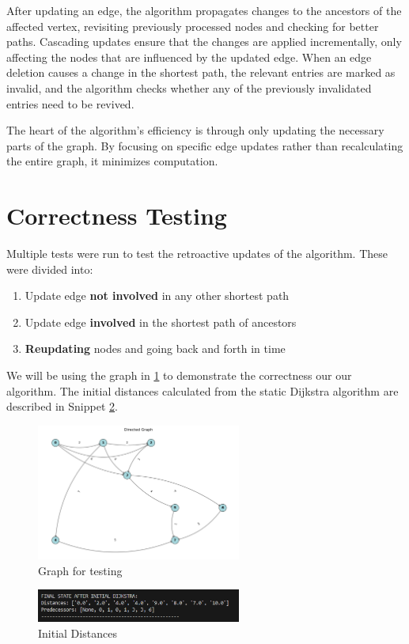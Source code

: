 \documentclass[12pt]{article}
\begin{document}
After updating an edge, the algorithm propagates changes to the ancestors of the affected vertex, revisiting previously processed nodes and checking for better paths.
Cascading updates ensure that the changes are applied incrementally, only affecting the nodes that are influenced by the updated edge. When an edge deletion causes a change in the shortest path, the relevant entries are marked as invalid, and the algorithm checks whether any of the previously invalidated entries need to be revived. 

The heart of the algorithm's efficiency is through only updating the necessary parts of the graph. By focusing on specific edge updates rather than recalculating the entire graph, it minimizes computation.


\section*{Correctness Testing}
Multiple tests were run to test the retroactive updates of the algorithm. These were divided into:
\begin{enumerate}
    \item Update edge \textbf{not involved} in any other shortest path 
    \item Update edge \textbf{involved} in the shortest path of ancestors
    \item \textbf{Reupdating} nodes and going back and forth in time
\end{enumerate}
We will be using the graph in \ref{fig:graph} to demonstrate the correctness our our algorithm. The initial distances calculated from the static Dijkstra algorithm are described in Snippet \ref{fig:initialdists}. 


\begin{figure}[h!]
    \centering
    \includegraphics[width=0.6\textwidth]{graph.png}
    \caption{Graph for testing} 
    \label{fig:graph}
\end{figure}


\begin{figure}[h!]
    \centering
    \includegraphics[width=0.6\textwidth]{initial distances.png}
    \caption{Initial Distances} 
    \label{fig:initialdists}
\end{figure}
\end{document}

